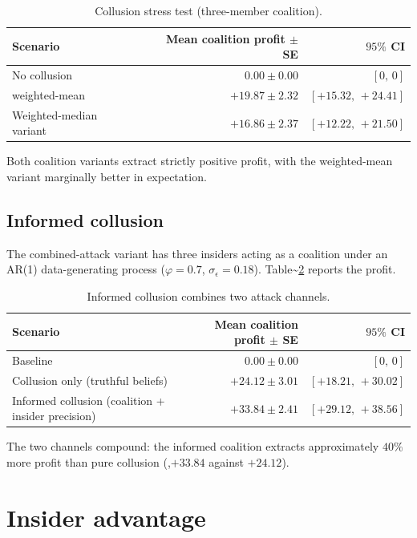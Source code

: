 \documentclass[
  11pt,
  a4paper,
  oneside]{report}
\begin{document}
\begin{table}[h]
\centering
\small
\begin{tabular}{lrr}
\toprule
Scenario & Mean coalition profit $\pm$ SE & $95\%$ CI \\
\midrule
No collusion & $0.00 \pm 0.00$ & $[0,\, 0]$ \\
\citet{chun2011cooperating} weighted-mean
  & $+19.87 \pm 2.32$ & $[+15.32,\, +24.41]$ \\
Weighted-median variant
  & $+16.86 \pm 2.37$ & $[+12.22,\, +21.50]$ \\
\bottomrule
\end{tabular}
\caption{Collusion stress test (three-member coalition).}
\label{tab:collusion}
\end{table}

Both coalition variants extract strictly positive profit, with the
weighted-mean variant marginally better in expectation.

\subsection{Informed collusion}\label{informed-collusion}

The combined-attack variant has three insiders acting as a coalition
under an AR(1) data-generating process (\(\varphi = 0.7\),
\(\sigma_\epsilon = 0.18\)).
Table\textasciitilde{}\ref{tab:informed-collusion} reports the profit.

\begin{table}[h]
\centering
\small
\begin{tabular}{lrr}
\toprule
Scenario & Mean coalition profit $\pm$ SE & $95\%$ CI \\
\midrule
Baseline & $0.00 \pm 0.00$ & $[0,\, 0]$ \\
Collusion only (truthful beliefs)
  & $+24.12 \pm 3.01$ & $[+18.21,\, +30.02]$ \\
Informed collusion (coalition + insider precision)
  & $+33.84 \pm 2.41$ & $[+29.12,\, +38.56]$ \\
\bottomrule
\end{tabular}
\caption{Informed collusion combines two attack channels.}
\label{tab:informed-collusion}
\end{table}

The two channels compound: the informed coalition extracts approximately
\(40\%\) more profit than pure collusion (,\(+33.84\) against
\(+24.12\)).

\section{Insider advantage}\label{insider-advantage}
\end{document}

